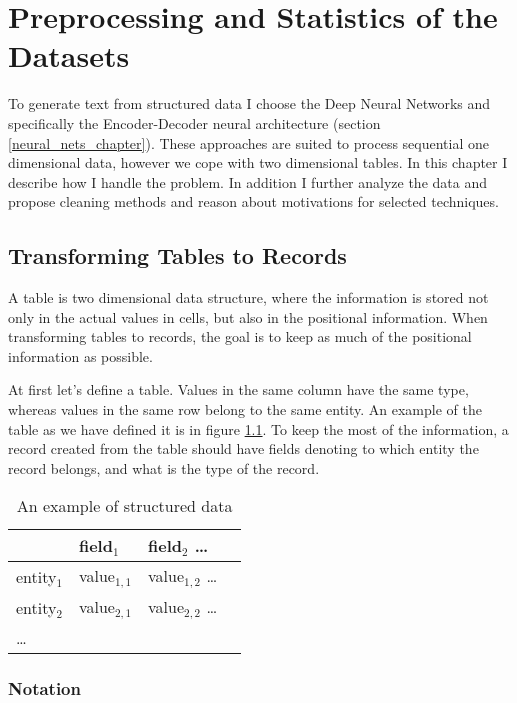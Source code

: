 \chapter{Preprocessing and Statistics of the Datasets} \label{chapPreproc}

To generate text from structured data I choose the Deep Neural Networks and specifically the Encoder-Decoder neural architecture (section \ref{neural_nets_chapter}). These ap\-\linebreak[4]proaches are suited to process sequential one dimensional data, however we cope with two dimensional tables. In this chapter I describe how I handle the problem. In addition I further analyze the data and propose cleaning methods and reason about motivations for selected techniques.

\section{Transforming Tables to Records} \label{table_to_record_trans}

A table is two dimensional data structure, where the information is stored not only in the actual values in cells, but also in the positional information. When transforming tables to records, the goal is to keep as much of the positional information as possible.

At first let's define a table. Values in the same column have the same type, whereas values in the same row belong to the same entity. An example of the table as we have defined it is in figure \ref{ex_struct}. To keep the most of the information, a record created from the table should have fields denoting to which entity the record belongs, and what is the type of the record.

\begin{table}[h]
    \centering
    \begin{tabular}{llll}
        \toprule
        {} & field$_1$ & field$_2$ \dots \\
        \midrule
        entity$_1$ & value$_{1,1}$ &  value$_{1,2}$ \dots \\
        entity$_2$ & value$_{2,1}$ & value$_{2,2}$ \dots \\
        \dots &&
    \end{tabular}
    \caption{An example of structured data} \label{ex_struct}
\end{table}

\subsection{Notation}

